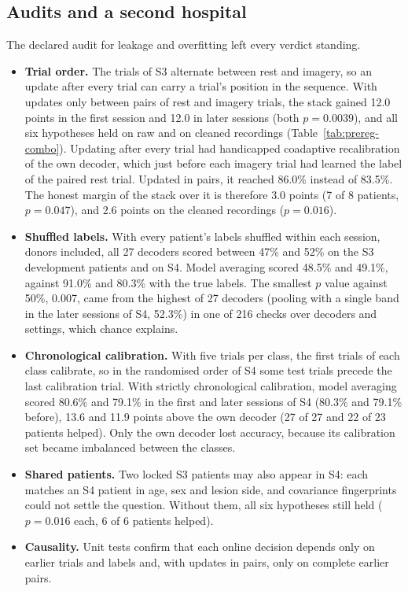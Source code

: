 \documentclass[pdflatex,sn-mathphys-num]{sn-jnl}
\begin{document}
\subsection{Audits and a second hospital}\label{sec:res-audit}

The declared audit for leakage and overfitting left every verdict standing.
\begin{itemize}
\item \textbf{Trial order.} The trials of S3 alternate between rest and imagery, so an update after every trial can carry a trial's position in the sequence. With updates only between pairs of rest and imagery trials, the stack gained 12.0 points in the first session and 12.0 in later sessions (both $p = 0.0039$), and all six hypotheses held on raw and on cleaned recordings (Table~\ref{tab:prereg-combo}). Updating after every trial had handicapped coadaptive recalibration of the own decoder, which just before each imagery trial had learned the label of the paired rest trial. Updated in pairs, it reached 86.0\% instead of 83.5\%. The honest margin of the stack over it is therefore 3.0 points (7 of 8 patients, $p = 0.047$), and 2.6 points on the cleaned recordings ($p = 0.016$).
\item \textbf{Shuffled labels.} With every patient's labels shuffled within each session, donors included, all 27 decoders scored between 47\% and 52\% on the S3 development patients and on S4. Model averaging scored 48.5\% and 49.1\%, against 91.0\% and 80.3\% with the true labels. The smallest $p$ value against 50\%, 0.007, came from the highest of 27 decoders (pooling with a single band in the later sessions of S4, 52.3\%) in one of 216 checks over decoders and settings, which chance explains.
\item \textbf{Chronological calibration.} With five trials per class, the first trials of each class calibrate, so in the randomised order of S4 some test trials precede the last calibration trial. With strictly chronological calibration, model averaging scored 80.6\% and 79.1\% in the first and later sessions of S4 (80.3\% and 79.1\% before), 13.6 and 11.9 points above the own decoder (27 of 27 and 22 of 23 patients helped). Only the own decoder lost accuracy, because its calibration set became imbalanced between the classes.
\item \textbf{Shared patients.} Two locked S3 patients may also appear in S4: each matches an S4 patient in age, sex and lesion side, and covariance fingerprints could not settle the question. Without them, all six hypotheses still held ($p = 0.016$ each, 6 of 6 patients helped).
\item \textbf{Causality.} Unit tests confirm that each online decision depends only on earlier trials and labels and, with updates in pairs, only on complete earlier pairs.
\end{itemize}
\end{document}
